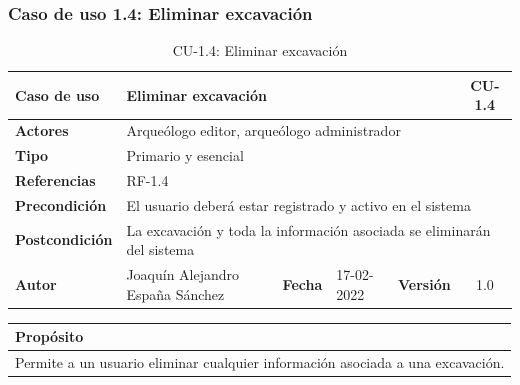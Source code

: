 \subsubsection{Caso de uso 1.4: Eliminar excavación}

    \begin{table}[H]
    \begin{center}
        \begin{adjustbox}{width=\textwidth}
        \begin{tabular}{ | l | l | l | l | c | c | } 
            \hline
            \textbf{Caso de uso} & \multicolumn{4}{l|}{Eliminar excavación} & \cellcolor{gray!50} \textbf{CU-1.4}\\
            \hline
            \textbf{Actores} & \multicolumn{5}{p{0.9\linewidth}|}{Arqueólogo editor, arqueólogo administrador} \\
            \hline
            \textbf{Tipo} & \multicolumn{5}{l|}{Primario y esencial} \\
            \hline
            \textbf{Referencias} & \multicolumn{3}{l|}{RF-1.4} & \multicolumn{2}{l|}{ }\\
            \hline
            \textbf{Precondición} & \multicolumn{5}{l|}{El usuario deberá estar registrado y activo en el sistema} \\
            \hline
            \textbf{Postcondición} & \multicolumn{5}{l|}{La excavación y toda la información asociada se eliminarán del
            sistema} \\
            \hline
            \textbf{Autor} & \multicolumn{1}{p{0.25\linewidth}|}{Joaquín Alejandro España Sánchez} & \textbf{Fecha} & 
            17-02-2022     & \textbf{Versión}                                                      & 1.0\\
            \hline
        \end{tabular}
        \end{adjustbox}
        \caption{CU-1.4: Eliminar excavación}
        \label{tab:delete-excavation}
    \end{center}
    \end{table}

    \begin{table}[H]
        \centering
        \begin{tabularx}{\textwidth}{@{} |L |@{}} \hline
            \textbf{Propósito} \\
            \hline
            Permite a un usuario eliminar cualquier información asociada a una excavación. \\
            \hline
        \end{tabularx}
    \end{table}

